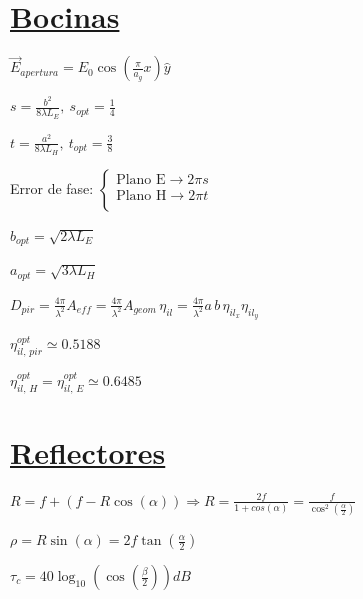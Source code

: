 \documentclass[twocolumn, 8pt]{extarticle}
\begin{document}
\vspace{0.5cm}
\section*{\underline{Bocinas}}

\( \vec{E}_{apertura} = E_0 \cos \left( \frac{\pi}{a_g}x \right) \hat{y} \)

\vspace{0.5cm}
\( s = \frac{ b^2 }{ 8\lambda L_E}, \ s_{opt} = \frac{1}{4} \)

\vspace{0.5cm}
\( t = \frac{ a^2 }{ 8\lambda L_H}, \ t_{opt} = \frac{3}{8} \)

\vspace{0.5cm}
Error de fase: \( \left \{
\begin{array}{l}
	\text{Plano E} \rightarrow 2\pi s \\
	\text{Plano H} \rightarrow 2\pi t \\
\end{array}
\right . \)

\vspace{0.5cm}
\( b_{opt} = \sqrt{ 2\lambda L_E } \)

\vspace{0.5cm}
\( a_{opt} = \sqrt{ 3\lambda L_H } \)

\vspace{0.5cm}
\( D_{pir} = \frac{ 4\pi }{ \lambda^2 } A_{eff} = \frac{ 4\pi }{ \lambda^2 } A_{geom} \, \eta_{il} = \frac{ 4\pi }{ \lambda^2 } a \, b \, \eta_{il_x} \eta_{il_y} \)

\vspace{0.5cm}
\( \eta^{opt}_{il ,\, pir} \simeq 0.5188 \)

\vspace{0.5cm}
\( \eta^{opt}_{il ,\, H} =  \eta^{opt}_{il ,\, E} \simeq 0.6485 \)

\newpage
\section*{\underline{Reflectores}}

\( R = f + (f - R\cos(\alpha)) \Rightarrow R = \frac{2f}{1 + cos(\alpha)} = \frac{f}{\cos^2\left(\frac{\alpha}{2}\right)}\)

\vspace{0.5cm}
\( \rho = R \sin(\alpha) = 2f \tan\left(\frac{\alpha}{2}\right) \)

\vspace{0.5cm}
\( \tau_c = 40\log_{10}\left(\cos\left(\frac{\beta}{2}\right)\right) dB \)
\end{document}
